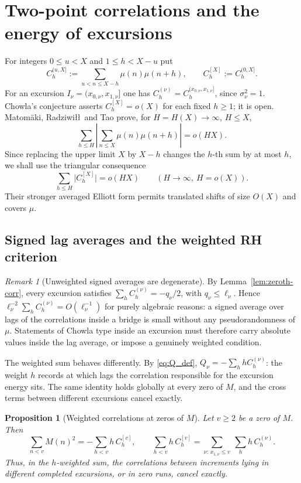 \documentclass[11pt]{amsart}
\numberwithin{equation}{section}
\theoremstyle{plain}
\newtheorem{proposition}[theorem]{Proposition}
\theoremstyle{definition}
\theoremstyle{remark}
\newtheorem{remark}[theorem]{Remark}
\begin{document}
\section{Two-point correlations and the energy of excursions}
\label{sec:chowla}

For integers $0\le u<X$ and $1\le h<X-u$ put
\[
C^{(u,X]}_h:=\sum_{u<n\le X-h}\mu(n)\mu(n+h),\qquad
C^{[X]}_h:=C^{(0,X]}_h .
\]
For an excursion $I_\nu=(x_{0,\nu},x_{1,\nu}]$ one has
$C_h^{(\nu)}=C_h^{(x_{0,\nu},x_{1,\nu}]}$, since $\sigma_\nu^2=1$.
Chowla's conjecture asserts $C^{[X]}_h=o(X)$ for each fixed $h\ge1$; it is
open. Matom\"aki, Radziwi\l\l\ and Tao \cite{MRT15} prove, for
$H=H(X)\to\infty$, $H\le X$,
\[
\sum_{h\le H}\left|\sum_{n\le X}\mu(n)\mu(n+h)\right|=o(HX).
\]
Since replacing the upper limit $X$ by $X-h$ changes the $h$-th sum by at
most $h$, we shall use the triangular consequence
\begin{equation}
\label{eq:MRT}
\sum_{h\le H}\bigl|C^{[X]}_h\bigr|=o(HX)
\qquad(H\to\infty,\ H=o(X)).
\end{equation}
Their stronger averaged Elliott form permits translated shifts of size
$O(X)$ and covers $\mu$.

\subsection{Signed lag averages and the weighted RH criterion}

\begin{remark}[Unweighted signed averages are degenerate]
\label{rem:chowla-degenerate}
By Lemma~\ref{lem:zeroth-corr}, every excursion satisfies
$\sum_hC_h^{(\nu)}=-q_\nu/2$, with $q_\nu\le\ell_\nu$. Hence
$\ell_\nu^{-2}\sum_hC^{(\nu)}_h=O(\ell_\nu^{-1})$ for purely algebraic
reasons: a signed average over lags of the correlations inside a bridge is
small without any pseudorandomness of $\mu$. Statements of Chowla type
inside an excursion must therefore carry absolute values inside the lag
average, or impose a genuinely weighted condition.
\end{remark}

The weighted sum behaves differently. By \eqref{eq:Q_def},
$Q_\nu=-\sum_hhC_h^{(\nu)}$: the weight $h$ records at which lags the
correlation responsible for the excursion energy sits. The same identity
holds globally at every zero of $M$, and the cross terms between different
excursions cancel exactly.

\begin{proposition}[Weighted correlations at zeros of $M$]
\label{prop:weighted-global}
Let $v\ge2$ be a zero of $M$. Then
\begin{equation}
\label{eq:weighted-global}
\sum_{n<v}M(n)^2=-\sum_{h<v}h\,C^{[v]}_h,
\qquad
\sum_{h<v}h\,C^{[v]}_h=\sum_{\nu:\,x_{1,\nu}\le v}\ \sum_hh\,C^{(\nu)}_h .
\end{equation}
Thus, in the $h$-weighted sum, the correlations between increments lying in
different completed excursions, or in zero runs, cancel exactly.
\end{proposition}
\end{document}
